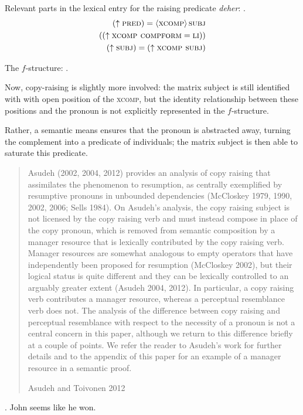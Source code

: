 \documentclass[11pt]{article}
\begin{document}
Relevant parts in the lexical entry for the raising predicate \emph{deher}:
\ex.  \begin{align*}
  (\uparrow \textsc{pred}) = \left\langle \textsc{xcomp} \right\rangle \textsc{subj} \\
  ((\uparrow \textsc{xcomp compform} = \textsc{li})) \\
  (\uparrow \textsc{subj}) = (\uparrow \textsc{xcomp subj}) \\
\end{align*}

The \(f\)-structure:
\ex. 

Now, copy-raising is slightly more involved: the matrix subject is still identified with with open position of the \textsc{xcomp}, but the identity relationship between these positions and the pronoun is not explicitly represented in the \(f\)-structure.

Rather, a semantic means ensures that the pronoun is abstracted away, turning the complement into a predicate of individuals; the matrix subject is then able to saturate this predicate.
\blockquote[Asudeh and Toivonen 2012]{
Asudeh (2002, 2004, 2012) provides an analysis of copy raising that assimilates the phenomenon to resumption, as centrally exemplified by resumptive pronouns in unbounded dependencies (McCloskey 1979, 1990, 2002, 2006; Sells 1984). 
On Asudeh’s analysis, the copy raising subject is not licensed by the copy raising verb and must instead compose in place of the copy pronoun, which is removed from semantic composition by a manager resource that is lexically contributed by the copy raising verb. 
Manager resources are somewhat analogous to empty operators that have independently been proposed for resumption (McCloskey 2002), but their logical status is quite different and they can be lexically controlled to an arguably greater extent (Asudeh 2004, 2012). 
In particular, a copy raising verb contributes a manager resource, whereas a perceptual resemblance verb does not. 
The analysis of the difference between copy raising and perceptual resemblance with respect to the necessity of a pronoun is not a central concern in this paper, although we return to this difference briefly at a couple of points. 
We refer the reader to Asudeh’s work for further details and to the appendix of this paper for an example of a manager resource in a semantic proof.
}
\ex. John seems like he won.
\end{document}
